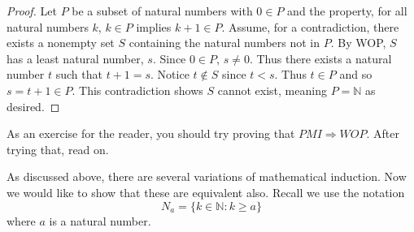 \documentclass[
  twoside,
  12pt,
  letterpaper]{article}
\theoremstyle{definition}
\theoremstyle{definition}
\theoremstyle{definition}
\theoremstyle{plain}
\theoremstyle{plain}
\theoremstyle{remark}
\begin{document}
\begin{proof}

Let \(P\) be a subset of natural numbers with \(0\in P\) and the
property, for all natural numbers \(k\), \(k\in P\) implies
\(k+1\in P\). Assume, for a contradiction, there exists a nonempty set
\(S\) containing the natural numbers not in \(P\). By WOP, \(S\) has a
least natural number, \(s\). Since \(0\in P\), \(s\neq 0\). Thus there
exists a natural number \(t\) such that \(t+1=s\). Notice \(t\not\in S\)
since \(t<s\). Thus \(t\in P\) and so \(s=t+1\in P\). This contradiction
shows \(S\) cannot exist, meaning \(P=\mathbb{N}\) as desired.

\end{proof}

As an exercise for the reader, you should try proving that
\(PMI\Rightarrow WOP\). After trying that, read on.

As discussed above, there are several variations of mathematical
induction. Now we would like to show that these are equivalent also.
Recall we use the notation \begin{equation}
N_a = \{k\in \mathbb{N}: k\geq a\}
\end{equation} where \(a\) is a natural number.


\printbibliography



\thispagestyle{empty}
\end{document}
